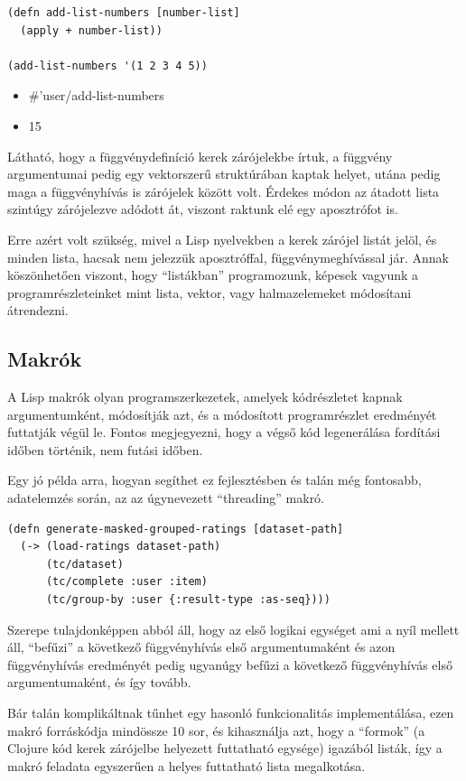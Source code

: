 \documentclass[final, 12pt] {ubb_dolgozat}{book}
\begin{document}
\begin{verbatim}
(defn add-list-numbers [number-list]
  (apply + number-list))

(add-list-numbers '(1 2 3 4 5))
\end{verbatim}

\begin{itemize}
\item \#'user/add-list-numbers
\item 15
\end{itemize}

Látható, hogy a függvénydefiníció kerek zárójelekbe írtuk, a függvény argumentumai pedig egy vektorszerű struktúrában kaptak helyet, utána pedig maga a függvényhívás is zárójelek között volt. Érdekes módon az átadott lista szintúgy zárójelezve adódott át, viszont raktunk elé egy aposztrófot is.

Erre azért volt szükség, mivel a Lisp nyelvekben a kerek zárójel listát jelöl, és minden lista, hacsak nem jelezzük aposztróffal, függvénymeghívással jár. Annak köszönhetően viszont, hogy ``listákban'' programozunk, képesek vagyunk a programrészleteinket mint lista, vektor, vagy halmazelemeket
módosítani átrendezni.

\subsection{Makrók}
\label{sec:org3a85caa}
A Lisp makrók olyan programszerkezetek, amelyek kódrészletet kapnak argumentumként, módosítják azt, és a módosított programrészlet eredményét futtatják végül le. Fontos megjegyezni, hogy a végső kód legenerálása fordítási időben történik, nem futási időben.

Egy jó példa arra, hogyan segíthet ez fejlesztésben és talán még fontosabb, adatelemzés során, az az úgynevezett ``threading'' makró.

\begin{verbatim}
(defn generate-masked-grouped-ratings [dataset-path]
  (-> (load-ratings dataset-path)
      (tc/dataset)
      (tc/complete :user :item)
      (tc/group-by :user {:result-type :as-seq})))
\end{verbatim}

Szerepe tulajdonképpen abból áll, hogy az első logikai egységet ami a nyíl mellett áll, ``befűzi'' a következő függvényhívás
első argumentumaként és azon függvényhívás eredményét pedig ugyanúgy befűzi a következő függvényhívás első argumentumaként, és így tovább.

Bár talán komplikáltnak tűnhet egy hasonló funkcionalitás implementálása, ezen makró forráskódja mindössze 10 sor, és
kihasználja azt, hogy a ``formok'' (a Clojure kód kerek zárójelbe helyezett futtatható egysége) igazából listák, így a makró feladata egyszerűen a helyes futtatható lista megalkotása.
\end{document}
